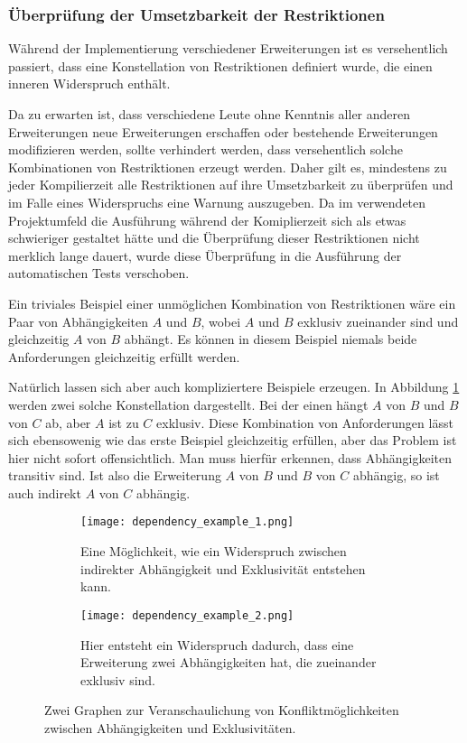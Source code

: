 \subsubsection{Überprüfung der Umsetzbarkeit der Restriktionen}
Während  der Implementierung verschiedener Erweiterungen ist es versehentlich passiert, dass eine Konstellation von Restriktionen definiert wurde, die einen inneren Widerspruch enthält.

Da zu erwarten ist, dass verschiedene Leute ohne Kenntnis aller anderen Erweiterungen neue Erweiterungen erschaffen oder bestehende Erweiterungen modifizieren werden, sollte verhindert werden, dass versehentlich solche Kombinationen von Restriktionen erzeugt werden. Daher gilt es, mindestens zu jeder Kompilierzeit alle Restriktionen auf ihre Umsetzbarkeit zu überprüfen und im Falle eines Widerspruchs eine Warnung auszugeben. Da im verwendeten Projektumfeld die Ausführung während der Komiplierzeit sich als etwas schwieriger gestaltet hätte und die Überprüfung dieser Restriktionen nicht merklich lange dauert, wurde diese Überprüfung in die Ausführung der automatischen Tests verschoben.

Ein triviales Beispiel einer unmöglichen Kombination von Restriktionen wäre ein Paar von Abhängigkeiten $A$ und $B$, wobei $A$ und $B$ exklusiv zueinander sind und gleichzeitig $A$ von $B$ abhängt. Es können in diesem Beispiel niemals beide Anforderungen gleichzeitig erfüllt werden.

Natürlich lassen sich aber auch kompliziertere Beispiele erzeugen. In Abbildung \ref{fig:impl:dependency_conflict_examples} werden zwei solche Konstellation dargestellt. Bei der einen hängt $A$ von $B$ und $B$ von $C$ ab, aber $A$ ist zu $C$ exklusiv. Diese Kombination von Anforderungen lässt sich ebensowenig wie das erste Beispiel gleichzeitig erfüllen, aber das Problem ist hier nicht sofort offensichtlich. Man muss hierfür erkennen, dass Abhängigkeiten transitiv sind. Ist also die Erweiterung $A$ von $B$ und $B$ von $C$ abhängig, so ist auch indirekt $A$ von $C$ abhängig.

  \begin{figure}
		\centering
		\begin{subfigure}[a]{0.4\linewidth}
			\texttt{[image: dependency\_example\_1.png]}
      		\caption{Eine Möglichkeit, wie ein Widerspruch zwischen indirekter Abhängigkeit und Exklusivität entstehen kann.}
		\end{subfigure}
		\begin{subfigure}[a]{0.4\linewidth}
			\texttt{[image: dependency\_example\_2.png]}
      		\caption{Hier entsteht ein Widerspruch dadurch, dass eine Erweiterung zwei Abhängigkeiten hat, die zueinander exklusiv sind.}
		\end{subfigure}
		\caption{Zwei Graphen zur Veranschaulichung von Konfliktmöglichkeiten zwischen Abhängigkeiten und Exklusivitäten.}
		\label{fig:impl:dependency_conflict_examples}
  \end{figure}

